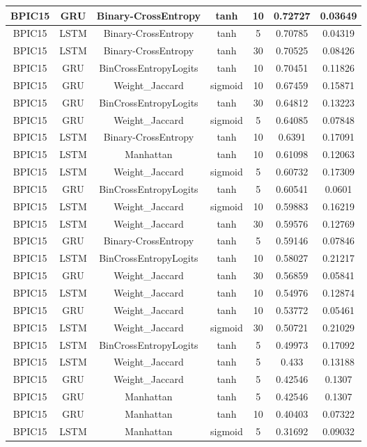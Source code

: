 \documentclass{article}%
\begin{document}
\begin{longtable}{|c|c|c|c|c|c|c|}
\hline%
BPIC15&GRU&Binary{-}CrossEntropy&tanh&10&0.72727&0.03649\\%
\hline%
BPIC15&LSTM&Binary{-}CrossEntropy&tanh&5&0.70785&0.04319\\%
\hline%
BPIC15&LSTM&Binary{-}CrossEntropy&tanh&30&0.70525&0.08426\\%
\hline%
BPIC15&GRU&BinCrossEntropyLogits&tanh&10&0.70451&0.11826\\%
\hline%
BPIC15&GRU&Weight\_Jaccard&sigmoid&10&0.67459&0.15871\\%
\hline%
BPIC15&GRU&BinCrossEntropyLogits&tanh&30&0.64812&0.13223\\%
\hline%
BPIC15&GRU&Weight\_Jaccard&sigmoid&5&0.64085&0.07848\\%
\hline%
BPIC15&LSTM&Binary{-}CrossEntropy&tanh&10&0.6391&0.17091\\%
\hline%
BPIC15&LSTM&Manhattan&tanh&10&0.61098&0.12063\\%
\hline%
BPIC15&LSTM&Weight\_Jaccard&sigmoid&5&0.60732&0.17309\\%
\hline%
BPIC15&GRU&BinCrossEntropyLogits&tanh&5&0.60541&0.0601\\%
\hline%
BPIC15&LSTM&Weight\_Jaccard&sigmoid&10&0.59883&0.16219\\%
\hline%
BPIC15&LSTM&Weight\_Jaccard&tanh&30&0.59576&0.12769\\%
\hline%
BPIC15&GRU&Binary{-}CrossEntropy&tanh&5&0.59146&0.07846\\%
\hline%
BPIC15&LSTM&BinCrossEntropyLogits&tanh&10&0.58027&0.21217\\%
\hline%
BPIC15&GRU&Weight\_Jaccard&tanh&30&0.56859&0.05841\\%
\hline%
BPIC15&LSTM&Weight\_Jaccard&tanh&10&0.54976&0.12874\\%
\hline%
BPIC15&GRU&Weight\_Jaccard&tanh&10&0.53772&0.05461\\%
\hline%
BPIC15&LSTM&Weight\_Jaccard&sigmoid&30&0.50721&0.21029\\%
\hline%
BPIC15&LSTM&BinCrossEntropyLogits&tanh&5&0.49973&0.17092\\%
\hline%
BPIC15&LSTM&Weight\_Jaccard&tanh&5&0.433&0.13188\\%
\hline%
BPIC15&GRU&Weight\_Jaccard&tanh&5&0.42546&0.1307\\%
\hline%
BPIC15&GRU&Manhattan&tanh&5&0.42546&0.1307\\%
\hline%
BPIC15&GRU&Manhattan&tanh&10&0.40403&0.07322\\%
\hline%
BPIC15&LSTM&Manhattan&sigmoid&5&0.31692&0.09032\\%

\end{longtable}
\end{document}

